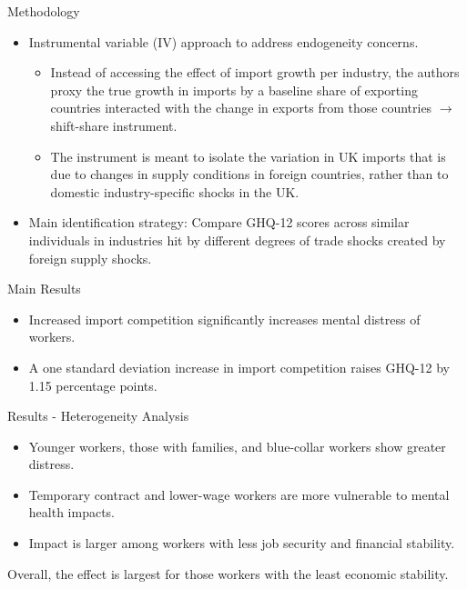 \documentclass{beamer}
\begin{document}
\begin{frame}{Methodology}
    \begin{itemize}
        \item Instrumental variable (IV) approach to address endogeneity concerns. %
        \begin{itemize} \pause
            \item Instead of accessing the effect of import growth per industry, the authors proxy the true growth in imports by a baseline share of exporting countries interacted with the change in exports from those countries $\rightarrow$ shift-share instrument.
            \item The instrument is meant to isolate the variation in UK imports that is due to changes in supply conditions in foreign countries, rather than to domestic industry-specific shocks in the UK. %
        \end{itemize}
        \item Main identification strategy: Compare GHQ-12 scores across similar individuals in industries hit by different degrees of trade shocks created by foreign supply shocks.
    \end{itemize}
\end{frame}

\begin{frame}{Main Results}
    \begin{itemize}
        \item Increased import competition significantly increases mental distress of workers.
        \item A one standard deviation increase in import competition raises GHQ-12 by 1.15 percentage points.
    \end{itemize}
\end{frame}

\begin{frame}{Results - Heterogeneity Analysis}
    \begin{itemize}
        \item Younger workers, those with families, and blue-collar workers show greater distress.
        \item Temporary contract and lower-wage workers are more vulnerable to mental health impacts.
        \item Impact is larger among workers with less job security and financial stability.
    \end{itemize}
    Overall, the effect is largest for those workers with the least economic stability.
\end{frame}
\end{document}
